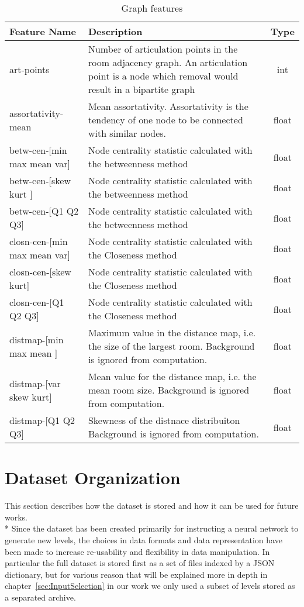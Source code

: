 \begin{table}
	\begin{tabularx}{\textwidth}{| l | X | c |}
		\hline
		Feature Name & Description & Type \\
		\hline
		art-points	&	Number of articulation points in the room adjacency graph. An articulation point is a node which removal would result in a bipartite graph	&	int\\
		assortativity-mean	&	Mean assortativity. Assortativity is the tendency of one node to be connected with similar nodes.	&	float\\
		betw-cen-[min \textbar  max \textbar  mean \textbar  var]	&	Node centrality statistic calculated with the betweenness method	&	float\\
		betw-cen-[skew \textbar  kurt ]	&	Node centrality statistic calculated with the betweenness method	&	float\\
		betw-cen-[Q1 \textbar  Q2 \textbar  Q3]	&	Node centrality statistic calculated with the betweenness method	&	float\\
		closn-cen-[min \textbar  max \textbar  mean \textbar  var]	&	Node centrality statistic calculated with the Closeness method	&	float\\
		closn-cen-[skew \textbar  kurt]	&	Node centrality statistic calculated with the Closeness method	&	float\\
		closn-cen-[Q1 \textbar  Q2 \textbar  Q3]	&	Node centrality statistic calculated with the Closeness method	&	float\\
		distmap-[min \textbar  max \textbar  mean ]	&	Maximum value in the distance map, i.e. the size of the largest room. Background is ignored from computation.	&	float\\
		distmap-[var \textbar  skew \textbar  kurt]	&	Mean value for the distance map, i.e. the mean room size.  Background is ignored from computation.	&	float\\
		distmap-[Q1 \textbar  Q2 \textbar  Q3]	&	Skewness of the distnace distribuiton  Background is ignored from computation.	&	float\\
		\hline
	\end{tabularx}
	\caption[ Features: Graph ]{ Graph features }
	\label{tab:featuresgraph}
\end{table}	


\section{Dataset Organization}
\label{sec:DatasetOrganization}
This section describes how the dataset is stored and how it can be used for future works. \\* 
Since the dataset has been created primarily for instructing a neural network to generate new levels, the choices in data formats and data representation have been made to increase re-usability and flexibility in data manipulation. In particular the full dataset is stored first as a set of files indexed by a JSON dictionary, but for various reason that will be explained more in depth in  chapter~\ref{sec:InputSelection} in our work we only used a subset of levels stored as a separated archive.
